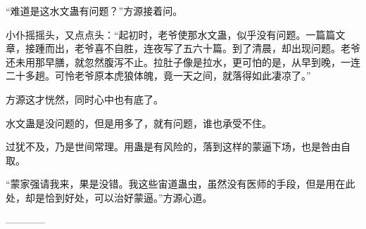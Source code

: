 \begin{this_body}
“难道是这水文蛊有问题？”方源接着问。

小仆摇摇头，又点点头：“起初时，老爷使那水文蛊，似乎没有问题。一篇篇文章，接踵而出，老爷喜不自胜，连夜写了五六十篇。到了清晨，却出现问题。老爷还未用那早膳，就忽然腹泻不止。拉肚子像是拉水，更可怕的是，从早到晚，一连二十多趟。可怜老爷原本虎狼体魄，竟一天之间，就落得如此凄凉了。”

方源这才恍然，同时心中也有底了。

水文蛊是没问题的，但是用多了，就有问题，谁也承受不住。

过犹不及，乃是世间常理。用蛊是有风险的，落到这样的蒙逼下场，也是咎由自取。

“蒙家强请我来，果是没错。我这些宙道蛊虫，虽然没有医师的手段，但是用在此处，却是恰到好处，可以治好蒙逼。”方源心道。

------------

\end{this_body}

